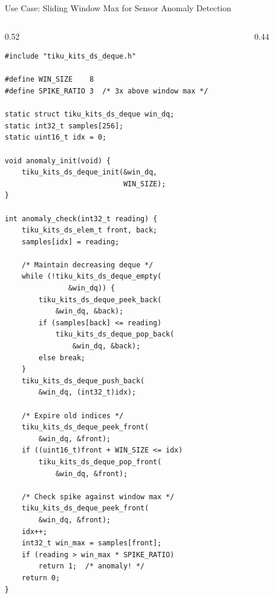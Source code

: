 \documentclass[aspectratio=169, 10pt]{beamer}
\begin{document}
\begin{frame}[fragile]{Use Case: Sliding Window Max for Sensor Anomaly Detection}
\begin{columns}[T]
\begin{column}{0.52\textwidth}
\begin{lstlisting}[style=cstyle,
  title={Detect anomaly spikes in sensor stream}]
#include "tiku_kits_ds_deque.h"

#define WIN_SIZE    8
#define SPIKE_RATIO 3  /* 3x above window max */

static struct tiku_kits_ds_deque win_dq;
static int32_t samples[256];
static uint16_t idx = 0;

void anomaly_init(void) {
    tiku_kits_ds_deque_init(&win_dq,
                            WIN_SIZE);
}

int anomaly_check(int32_t reading) {
    tiku_kits_ds_elem_t front, back;
    samples[idx] = reading;

    /* Maintain decreasing deque */
    while (!tiku_kits_ds_deque_empty(
               &win_dq)) {
        tiku_kits_ds_deque_peek_back(
            &win_dq, &back);
        if (samples[back] <= reading)
            tiku_kits_ds_deque_pop_back(
                &win_dq, &back);
        else break;
    }
    tiku_kits_ds_deque_push_back(
        &win_dq, (int32_t)idx);

    /* Expire old indices */
    tiku_kits_ds_deque_peek_front(
        &win_dq, &front);
    if ((uint16_t)front + WIN_SIZE <= idx)
        tiku_kits_ds_deque_pop_front(
            &win_dq, &front);

    /* Check spike against window max */
    tiku_kits_ds_deque_peek_front(
        &win_dq, &front);
    idx++;
    int32_t win_max = samples[front];
    if (reading > win_max * SPIKE_RATIO)
        return 1;  /* anomaly! */
    return 0;
}
\end{lstlisting}
\end{column}

\begin{column}{0.44\textwidth}
\begin{center}
\end{center}
\end{column}
\end{columns}
\end{frame}
\end{document}
